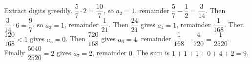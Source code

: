 Extract digits greedily. $\dfrac57\cdot2=\dfrac{10}7$, so $a_2=1$, remainder $\dfrac57-\dfrac12=\dfrac3{14}$. Then $\dfrac3{14}\cdot6=\dfrac97$, so $a_3=1$, remainder $\dfrac1{21}$. Then $\dfrac{24}{21}$ gives $a_4=1$, remainder $\dfrac1{168}$. Then $\dfrac{120}{168}<1$ gives $a_5=0$. Then $\dfrac{720}{168}$ gives $a_6=4$, remainder $\dfrac1{168}-\dfrac4{720}=\dfrac1{2520}$. Finally $\dfrac{5040}{2520}=2$ gives $a_7=2$, remainder $0$. The sum is $1+1+1+0+4+2=\boxed{9}$.

